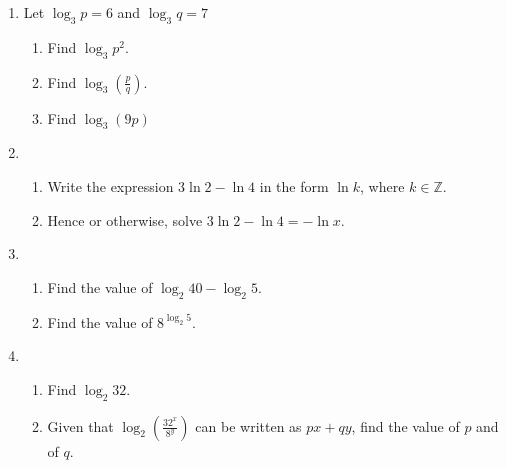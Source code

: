 \documentclass[12pt, oneside]{article}
\begin{document}
\begin{enumerate}
\item Let $\log_3 p = 6$ and $\log_3 q =7$
\begin{enumerate}
    \item Find $\log_3 p^2$.
        \begin{flushright}[2]\end{flushright}
    \item Find $\log_3 \left( \frac{p}{q} \right)$.
        \begin{flushright}[2]\end{flushright}
    \item Find $\log_3 (9p)$
        \begin{flushright}[3]\end{flushright}
\end{enumerate}

\item 
\begin{enumerate}
    \item Write the expression $3 \ln 2 - \ln 4$ in the form $\ln k$, where $k \in \mathbb{Z}$.
        \begin{flushright}[3]\end{flushright}
    \item Hence or otherwise, solve $3 \ln 2 - \ln 4=-\ln x$.
        \begin{flushright}[3]\end{flushright}
\end{enumerate}

\item 
\begin{enumerate}
    \item Find the value of $\log_2 40 - \log_2 5$.
        \begin{flushright}[3]\end{flushright}
    \item Find the value of $8^{\log_2 5}$.
        \begin{flushright}[4]\end{flushright}
\end{enumerate}

\item 
\begin{enumerate}
    \item Find $\log_2 32$.
        \begin{flushright}[1]\end{flushright}
    \item Given that $\displaystyle \log_2 \left( \frac{32^x}{8^y} \right)$ can be written as $px+qy$, find the value of $p$ and of $q$.
        \begin{flushright}[4]\end{flushright}
\end{enumerate}


\end{enumerate}
\end{document}
